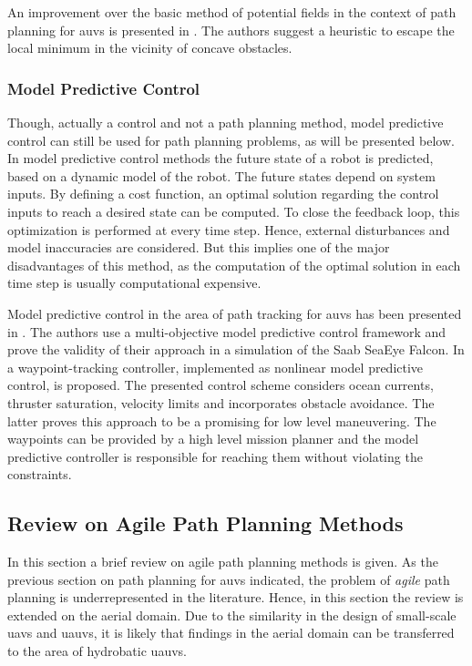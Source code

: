 An improvement over the basic method of potential fields in the context of path planning for \acp{auv} is presented in \cite{Fu-guang05}. The authors suggest a heuristic to escape the local minimum in the vicinity of concave obstacles.

\subsubsection{Model Predictive Control}

Though, actually a control and not a path planning method, model predictive control can still be used for path planning problems, as will be presented below. In model predictive control methods the future state of a robot is predicted, based on a dynamic model of the robot. The future states depend on system inputs. By defining a cost function, an optimal solution regarding the control inputs to reach a desired state can be computed. To close the feedback loop, this optimization is performed at every time step. Hence, external disturbances and model inaccuracies are considered. But this implies one of the major disadvantages of this method, as the computation of the optimal solution in each time step is usually computational expensive.

Model predictive control in the area of path tracking for \acp{auv} has been presented in \cite{Shen16}. The authors use a multi-objective model predictive control framework and prove the validity of their approach in a simulation of the Saab SeaEye Falcon. In \cite{Heshmati18} a waypoint-tracking controller, implemented as nonlinear model predictive control, is proposed. The presented control scheme considers ocean currents, thruster saturation, velocity limits and incorporates obstacle avoidance. The latter proves this approach to be a promising for low level maneuvering. The waypoints can be provided by a high level mission planner and the model predictive controller is responsible for reaching them without violating the constraints.



\subsection{Review on Agile Path Planning Methods}
In this section a brief review on agile path planning methods is given. As the previous section on path planning for \acp{auv} indicated, the problem of \emph{agile} path planning is underrepresented in the literature. Hence, in this section the review is extended on the aerial domain. Due to the similarity in the design of small-scale \acp{uav} and \acp{uauv}, it is likely that findings in the aerial domain can be transferred to the area of hydrobatic \acp{uauv}.

